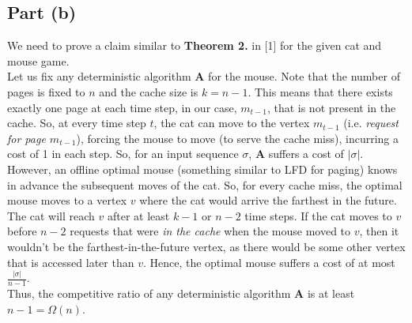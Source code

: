 \documentclass[11pt]{article}
\begin{document}
\subsection*{Part (b)}
We need to prove a claim similar to \textbf{Theorem 2.} in [1] for the given cat
and mouse game. \\
Let us fix any deterministic algorithm $\mathbf{A}$ for the mouse. Note that the
number of pages is fixed to $n$ and the cache size is $k = n-1$. This means that
there exists exactly one page at each time step, in our case, $m_{t-1}$, that is
not present in the cache. So, at every time step $t$, the cat can move to the vertex
$m_{t-1}$ (i.e. \textit{request for page $m_{t-1}$}), forcing the mouse
to move (to serve the cache miss), incurring a cost of 1 in each step. So, for an
input sequence $\sigma$, $\mathbf{A}$ suffers a cost of $|\sigma|$. \\
However, an offline optimal mouse (something similar to LFD for paging) knows in
advance the subsequent moves of the cat. So, for every cache miss, the optimal mouse
moves to a vertex $v$ where the cat would arrive the farthest in the future. The
cat will reach $v$ after at least $k-1$ or $n-2$ time steps. If the cat moves to $v$
before $n-2$ requests that were \textit{in the cache} when the mouse moved to $v$,
then it wouldn't be the farthest-in-the-future vertex, as there would be some other
vertex that is accessed later than $v$. Hence, the optimal mouse suffers a cost of at
most $\frac{|\sigma|}{n-1}$. \\
Thus, the competitive ratio of any deterministic algorithm $\mathbf{A}$ is at least
$n-1 = \Omega(n)$.
\end{document}
